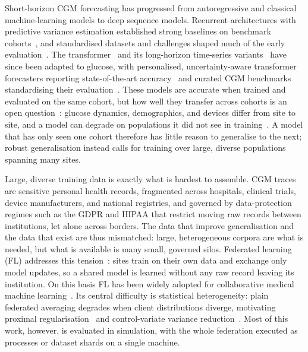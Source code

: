 \documentclass[10pt,letterpaper]{article}
\begin{document}
Short-horizon CGM forecasting has progressed from autoregressive and classical
machine-learning models to deep sequence models. Recurrent architectures with
predictive variance estimation established strong baselines on benchmark
cohorts~\cite{martinsson2020}, and standardised datasets and challenges shaped
much of the early evaluation~\cite{marling2020ohio}. The
transformer~\cite{vaswani2017attention} and its long-horizon time-series
variants~\cite{zhou2021informer,wu2021autoformer} have since been adapted to
glucose, with personalised, uncertainty-aware transformer forecasters reporting
state-of-the-art accuracy~\cite{sergazinov2023gluformer} and curated CGM
benchmarks standardising their evaluation~\cite{sergazinov2024glucobench}.
These models are accurate when trained and evaluated on the same cohort, but how
well they transfer across cohorts is an open question~\cite{ghimire2024generalize}:
glucose dynamics, demographics, and devices differ from site to site, and a model
can degrade on populations it did not see in training~\cite{farahmand2025glumind}.
A model that has only seen one cohort therefore has little reason to generalise to
the next; robust generalisation instead calls for training over large, diverse
populations spanning many sites.

Large, diverse training data is exactly what is hardest to assemble. CGM traces
are sensitive personal health records, fragmented across hospitals, clinical
trials, device manufacturers, and national registries, and governed by
data-protection regimes such as the GDPR and HIPAA that restrict moving raw
records between institutions, let alone across borders. The data that improve
generalisation and the data that exist are thus mismatched: large, heterogeneous
corpora are what is needed, but what is available is many small, governed silos.
Federated learning (FL) addresses this tension~\cite{mcmahan2017fedavg}: sites
train on their own data and exchange only model updates, so a shared model is
learned without any raw record leaving its institution. On this basis FL has been
widely adopted for collaborative medical machine
learning~\cite{rieke2020future,sheller2020federated,kaissis2020secure}. Its
central difficulty is statistical heterogeneity: plain federated averaging
degrades when client distributions diverge, motivating proximal
regularisation~\cite{li2020fedprox} and control-variate variance
reduction~\cite{karimireddy2020scaffold}. Most of this work, however, is evaluated
in simulation, with the whole federation executed as processes or dataset shards
on a single machine.
\end{document}
